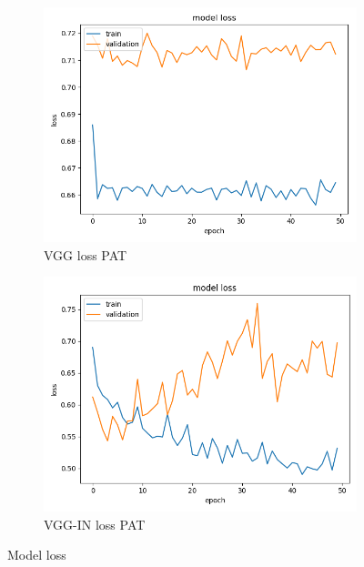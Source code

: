 \begin{figure}[h]
\begin{subfigure}[b]{.24\linewidth}
\includegraphics[width=\linewidth]{Figs/vgg_pat_loss.jpg}
\caption{VGG loss PAT}
\end{subfigure}
\begin{subfigure}[b]{.24\linewidth}
\includegraphics[width=\linewidth]{Figs/vgg_in_pat_loss.jpg}
\caption{VGG-IN loss PAT}
\end{subfigure}
\caption{Model loss}
\label{fig:loss}
\end{figure}

